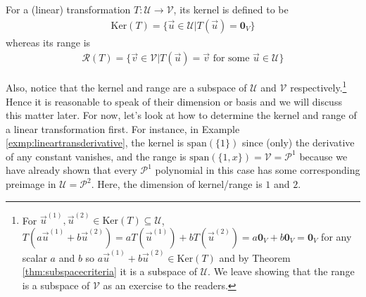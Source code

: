 \begin{defn}
\label{defn:kernelrange}
For a (linear) transformation $T: \mathcal{U} \to \mathcal{V}$, its kernel is defined to be
\begin{align}
\text{Ker}(T) = \{\vec{u} \in \mathcal{U} | T(\vec{u}) = \textbf{0}_V\}
\end{align}
whereas its range is
\begin{align}
\mathcal{R}(T) = \{\vec{v} \in \mathcal{V} | T(\vec{u}) = \vec{v} \text{ for some } \vec{u} \in \mathcal{U}\}    
\end{align}
\end{defn}
Also, notice that the kernel and range are a subspace of $\mathcal{U}$ and $\mathcal{V}$ respectively.\footnote{For $\vec{u}^{(1)}, \vec{u}^{(2)} \in \text{Ker}(T) \subseteq \mathcal{U}$, $T(a\vec{u}^{(1)} + b\vec{u}^{(2)}) = aT(\vec{u}^{(1)}) + bT(\vec{u}^{(2)}) = a\textbf{0}_V + b\textbf{0}_V = \textbf{0}_V$ for any scalar $a$ and $b$ so $a\vec{u}^{(1)} + b\vec{u}^{(2)} \in \text{Ker}(T)$ and by Theorem \ref{thm:subspacecriteria} it is a subspace of $\mathcal{U}$. We leave showing that the range is a subspace of $\mathcal{V}$ as an exercise to the readers.} Hence it is reasonable to speak of their dimension or basis and we will discuss this matter later. For now, let's look at how to determine the kernel and range of a linear transformation first. For instance, in Example \ref{exmp:lineartransderivative}, the kernel is $\text{span}(\{1\})$ since (only) the derivative of any constant vanishes, and the range is $\text{span}(\{1, x\}) = \mathcal{V} = \mathcal{P}^1$ because we have already shown that every $\mathcal{P}^1$ polynomial in this case has some corresponding preimage in $\mathcal{U} = \mathcal{P}^2$. Here, the dimension of kernel/range is $1$ and $2$.

